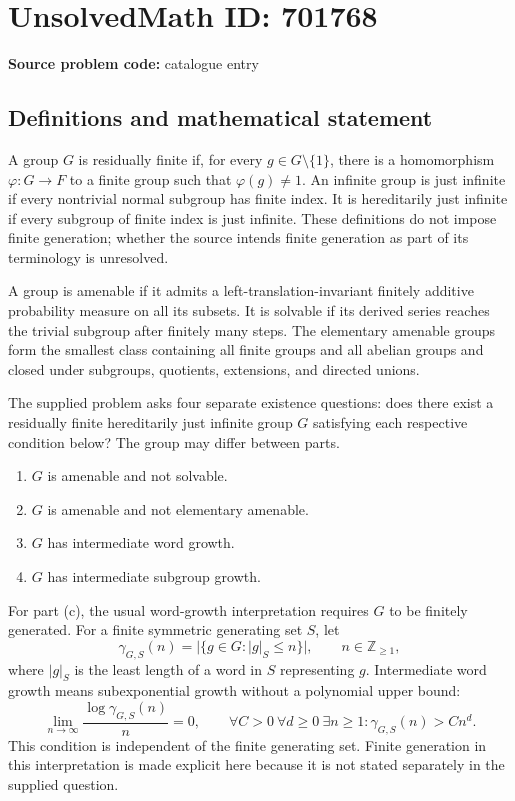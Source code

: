 \documentclass[11pt]{article}
\newcommand{\Z}{\mathbb{Z}}
\begin{document}
\section*{UnsolvedMath ID: 701768}
\textbf{Source problem code:} catalogue entry
\subsection{Definitions and mathematical statement}
A group \(G\) is residually finite if, for every \(g\in G\setminus\{1\}\), there is a homomorphism \(\varphi:G\to F\) to a finite group such that \(\varphi(g)\ne1\). An infinite group is just infinite if every nontrivial normal subgroup has finite index. It is hereditarily just infinite if every subgroup of finite index is just infinite. These definitions do not impose finite generation; whether the source intends finite generation as part of its terminology is unresolved.

A group is amenable if it admits a left-translation-invariant finitely additive probability measure on all its subsets. It is solvable if its derived series reaches the trivial subgroup after finitely many steps. The elementary amenable groups form the smallest class containing all finite groups and all abelian groups and closed under subgroups, quotients, extensions, and directed unions.

The supplied problem asks four separate existence questions: does there exist a residually finite hereditarily just infinite group \(G\) satisfying each respective condition below? The group may differ between parts.
\begin{enumerate}
\item[(a)] \(G\) is amenable and not solvable.
\item[(b)] \(G\) is amenable and not elementary amenable.
\item[(c)] \(G\) has intermediate word growth.
\item[(d)] \(G\) has intermediate subgroup growth.
\end{enumerate}

For part (c), the usual word-growth interpretation requires \(G\) to be finitely generated. For a finite symmetric generating set \(S\), let
\[
\gamma_{G,S}(n)=\bigl|\{g\in G:|g|_S\le n\}\bigr|,
\qquad n\in\Z_{\ge1},
\]
where \(|g|_S\) is the least length of a word in \(S\) representing \(g\). Intermediate word growth means subexponential growth without a polynomial upper bound:
\[
\lim_{n\to\infty}\frac{\log\gamma_{G,S}(n)}{n}=0,
\qquad
\forall C>0\ \forall d\ge0\ \exists n\ge1:
\gamma_{G,S}(n)>Cn^d.
\]
This condition is independent of the finite generating set. Finite generation in this interpretation is made explicit here because it is not stated separately in the supplied question.
\end{document}
